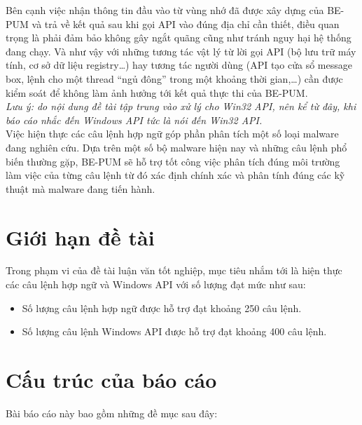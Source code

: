 Bên cạnh việc nhận thông tin đầu vào từ vùng nhớ đã được xây dựng của BE-PUM và trả về kết quả sau khi gọi API vào đúng địa chỉ cần thiết, điều quan trọng là phải đảm bảo không gây ngắt quãng cũng như tránh nguy hại hệ thống đang chạy.
Và như vậy với những tương tác vật lý từ lời gọi API (bộ lưu trữ máy tính, cơ sở dữ liệu registry…) hay tương tác người dùng (API tạo cửa sổ message box, lệnh cho một thread “ngủ đông” trong một khoảng thời gian,…) cần được kiểm soát để không làm ảnh hưởng tới kết quả thực thi của BE-PUM.\\

\textit{Lưu ý: do nội dung đề tài tập trung vào xử lý cho Win32 API, nên kể từ đây, khi báo cáo nhắc đến Windows API tức là nói đến Win32 API.}\\

Việc hiện thực các câu lệnh hợp ngữ góp phần phân tích một số loại malware đang nghiên cứu. Dựa trên một số bộ malware hiện nay và những câu lệnh phổ biến thường gặp, BE-PUM sẽ hỗ trợ tốt công việc phân tích đúng môi trường làm việc của từng câu lệnh từ đó xác định chính xác và phân tính đúng các kỹ thuật mà malware đang tiến hành.

\section{Giới hạn đề tài}

Trong phạm vi của đề tài luận văn tốt nghiệp, mục tiêu nhắm tới là hiện thực các câu lệnh hợp ngữ và Windows API với số lượng đạt mức như sau:

\begin{itemize}
  \item Số lượng câu lệnh hợp ngữ được hỗ trợ đạt khoảng 250 câu lệnh.
  \item Số lượng câu lệnh Windows API được hỗ trợ đạt khoảng 400 câu lệnh.
\end{itemize}

\section{Cấu trúc của báo cáo}

Bài báo cáo này bao gồm những đề mục sau đây:

